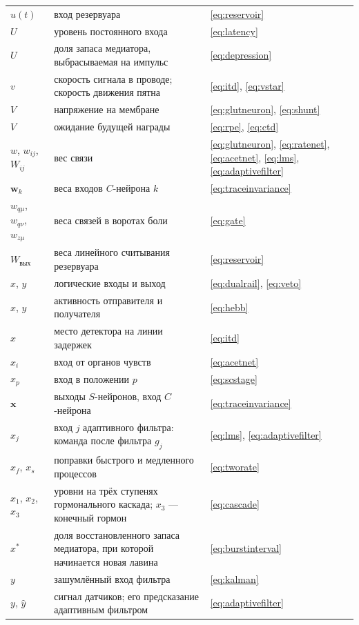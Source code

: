 \begin{center}
\begin{longtable}{>{\raggedright}p{2.0cm}>{\raggedright}p{9.6cm}>{\raggedright\arraybackslash}p{2.4cm}}
$u(t)$ & вход резервуара & \eqref{eq:reservoir} \\
$U$ & уровень постоянного входа & \eqref{eq:latency} \\
$U$ & доля запаса медиатора, выбрасываемая на импульс & \eqref{eq:depression} \\
$v$ & скорость сигнала в проводе; скорость движения пятна & \eqref{eq:itd}, \eqref{eq:vstar} \\
$V$ & напряжение на мембране & \eqref{eq:glutneuron}, \eqref{eq:shunt} \\
$V$ & ожидание будущей награды & \eqref{eq:rpe}, \eqref{eq:ctd} \\
$w$, $w_{ij}$, $W_{ij}$ & вес связи & \eqref{eq:glutneuron}, \eqref{eq:ratenet}, \eqref{eq:acetnet}, \eqref{eq:lms}, \eqref{eq:adaptivefilter} \\
$\mathbf w_k$ & веса входов $C$-нейрона $k$ & \eqref{eq:traceinvariance} \\
$w_{q\mu}$, $w_{q\nu}$, $w_{z\mu}$ & веса связей в воротах боли & \eqref{eq:gate} \\
$W_{\text{вых}}$ & веса линейного считывания резервуара & \eqref{eq:reservoir} \\
$x$, $y$ & логические входы и выход & \eqref{eq:dualrail}, \eqref{eq:veto} \\
$x$, $y$ & активность отправителя и получателя & \eqref{eq:hebb} \\
$x$ & место детектора на линии задержек & \eqref{eq:itd} \\
$x_i$ & вход от органов чувств & \eqref{eq:acetnet} \\
$x_p$ & вход в положении $p$ & \eqref{eq:scstage} \\
$\mathbf x$ & выходы $S$-нейронов, вход $C$-нейрона & \eqref{eq:traceinvariance} \\
$x_j$ & вход $j$ адаптивного фильтра: команда после фильтра $g_j$ & \eqref{eq:lms}, \eqref{eq:adaptivefilter} \\
$x_f$, $x_s$ & поправки быстрого и медленного процессов & \eqref{eq:tworate} \\
$x_1$, $x_2$, $x_3$ & уровни на трёх ступенях гормонального каскада; $x_3$ --- конечный гормон & \eqref{eq:cascade} \\
$x^*$ & доля восстановленного запаса медиатора, при которой начинается новая лавина & \eqref{eq:burstinterval} \\
$y$ & зашумлённый вход фильтра & \eqref{eq:kalman} \\
$y$, $\hat y$ & сигнал датчиков; его предсказание адаптивным фильтром & \eqref{eq:adaptivefilter} \\

\end{longtable}
\end{center}
